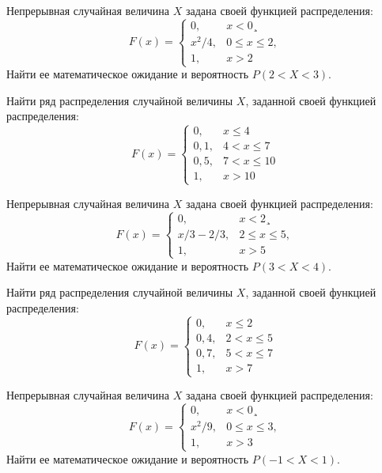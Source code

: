 \vfill

\z Непрерывная случайная величина $X$ задана своей функцией распределения: $$ F(x) = \begin{cases}0, & x < 0¸\\ x^2/4, & 0 \leqslant x \leqslant 2, \\ 1, & x > 2 \end{cases} $$ Найти ее математическое ожидание и вероятность $P(2 < X < 3)$.
 

\vfill

\newpage\setcounter{zad}{0}

\z Найти ряд распределения случайной величины $X$, заданной своей функцией распределения: $$ F(x) = \begin{cases}0, & x \leqslant 4 \\ 0{,}1, & 4 < x \leqslant 7 \\ 0{,}5, & 7 < x \leqslant 10 \\ 1, & x > 10 \end{cases} $$


\vfill

\z Непрерывная случайная величина $X$ задана своей функцией распределения: $$ F(x) = \begin{cases}0, & x < 2¸\\ x/3-2/3, & 2 \leqslant x \leqslant 5, \\ 1, & x > 5 \end{cases} $$ Найти ее математическое ожидание и вероятность $P(3 < X < 4)$.
 

\vfill

\newpage\setcounter{zad}{0}

\z Найти ряд распределения случайной величины $X$, заданной своей функцией распределения: $$ F(x) = \begin{cases}0, & x \leqslant 2 \\ 0{,}4, & 2 < x \leqslant 5 \\ 0{,}7, & 5 < x \leqslant 7 \\ 1, & x > 7 \end{cases} $$


\vfill

\z Непрерывная случайная величина $X$ задана своей функцией распределения: $$ F(x) = \begin{cases}0, & x < 0¸\\ x^2/9, & 0 \leqslant x \leqslant 3, \\ 1, & x > 3 \end{cases} $$ Найти ее математическое ожидание и вероятность $P(-1 < X < 1)$.
 

